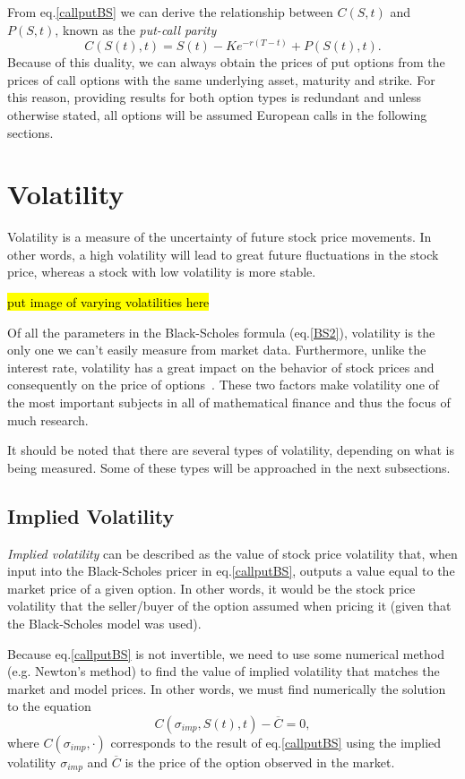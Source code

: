 From eq.\eqref{callputBS} we can derive the relationship between $C(S,t)$ and $P(S,t)$, known as the \emph{put-call parity}
\begin{equation}
C(S(t),t)=S(t)-Ke^{-r(T-t)}+P(S(t),t).
\end{equation}
\noindent Because of this duality, we can always obtain the prices of put options from the prices of call options with the same underlying asset, maturity and strike. For this reason, providing results for both option types is redundant and unless otherwise stated, all options will be assumed European calls in the following sections.


\section{Volatility}
\label{section:volatility}
Volatility is a measure of the uncertainty of future stock price movements. In other words, a high volatility will lead to great future fluctuations in the stock price, whereas a stock with low volatility is more stable.

\hl{put image of varying volatilities here}

Of all the parameters in the Black-Scholes formula (eq.\eqref{BS2}), volatility is the only one we can't easily measure from market data.
Furthermore, unlike the interest rate, volatility has a great impact on the behavior of stock prices and consequently on the price of options~\cite{Wilmott3}.
These two factors make volatility one of the most important subjects in all of mathematical finance and thus the focus of much research.



It should be noted that there are several types of volatility, depending on what is being measured. Some of these types will be approached in the next subsections.

\subsection{Implied Volatility}
\label{section:impliedvolatility}
\emph{Implied volatility} can be described as the value of stock price volatility that, when input into the Black-Scholes pricer in eq.\eqref{callputBS}, outputs a value equal to the market price of a given option.
In other words, it would be the stock price volatility that the seller/buyer of the option assumed when pricing it (given that the Black-Scholes model was used).

Because eq.\eqref{callputBS} is not invertible, we need to use some numerical method (e.g. Newton's method) to find the value of implied volatility that matches the market and model prices. In other words, we must find numerically the solution to the equation
\begin{equation}\label{impvolform}
C(\sigma_{imp},S(t),t)-\overline{C}=0,
\end{equation}
\noindent where $C(\sigma_{imp},\cdot)$ corresponds to the result of eq.\eqref{callputBS} using the implied volatility $\sigma_{imp}$ and $\overline{C}$ is the price of the option observed in the market.

